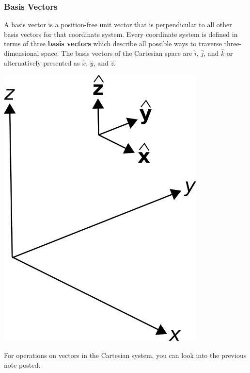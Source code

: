 \documentclass[12pt,addpoints]{exam}
\begin{document}
	\subsubsection*{Basis Vectors}
	A basis vector is a position-free unit vector that is perpendicular to all other basis vectors for that coordinate system. Every coordinate system is defined in terms of three \textbf{basis vectors} which describe all possible ways to traverse three-dimensional space. The basis vectors of the Cartesian space are $\hat{i}$, $\hat{j}$, and $\hat{k}$ or alternatively presented as $\hat{x}$, $\hat{y}$, and $\hat{z}$.
	\begin{center}
		\includegraphics[scale=0.85]{CartesianBasis.png}
	\end{center}
	For operations on vectors in the Cartesian system, you can look into the previous note posted.
\end{document}
